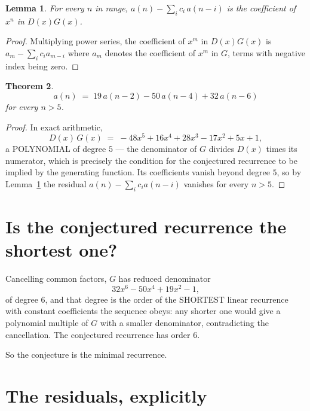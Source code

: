 \documentclass[11pt,a4paper]{article}
\theoremstyle{plain}
\newtheorem{theorem}{Theorem}
\newtheorem{lemma}[theorem]{Lemma}
\theoremstyle{definition}
\begin{document}
\begin{lemma}\label{lem:key}
For every $n$ in range, $a(n)-\sum_i c_i\,a(n-i)$ is the coefficient of $x^{n}$ in
$D(x)G(x)$.
\end{lemma}

\begin{proof}
Multiplying power series, the coefficient of $x^{m}$ in $D(x)G(x)$ is
$a_m-\sum_i c_i a_{m-i}$ where $a_m$ denotes the coefficient of $x^{m}$ in $G$, terms with
negative index being zero.
\end{proof}

\begin{theorem}
\[
a(n)\;=\;19\,a(n-2) - 50\,a(n-4) + 32\,a(n-6)
\]
for every $n>5$.
\end{theorem}

\begin{proof}
In exact arithmetic,
\[
D(x)\,G(x)\;=\;- 48 x^{5} + 16 x^{4} + 28 x^{3} - 17 x^{2} + 5 x + 1,
\]
a POLYNOMIAL of degree $5$ --- the denominator of $G$ divides $D(x)$ times its numerator,
which is precisely the condition for the conjectured recurrence to be implied by the
generating function. Its coefficients vanish beyond degree $5$, so by
Lemma~\ref{lem:key} the residual $a(n)-\sum_ic_ia(n-i)$ vanishes for every
$n>5$.
\end{proof}

\section{Is the conjectured recurrence the shortest one?}

Cancelling common factors, $G$ has reduced denominator
\[
32 x^{6} - 50 x^{4} + 19 x^{2} - 1,
\]
of degree $6$, and that degree is the order of the SHORTEST linear recurrence with
constant coefficients the sequence obeys: any shorter one would give a polynomial multiple of
$G$ with a smaller denominator, contradicting the cancellation. The conjectured recurrence has
order $6$.

So the conjecture is the minimal recurrence.

\section{The residuals, explicitly}
\end{document}
